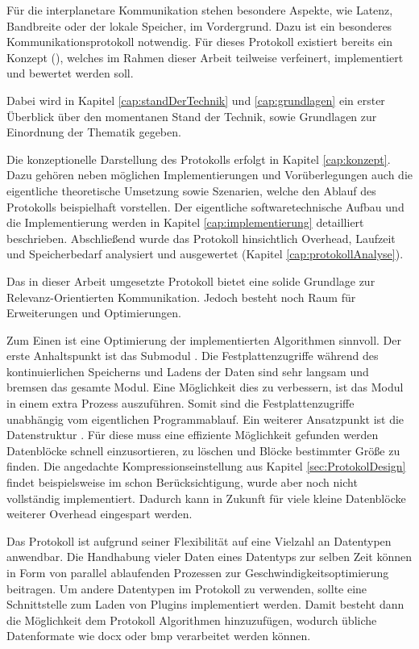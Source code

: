 Für die interplanetare Kommunikation stehen besondere Aspekte, wie Latenz,
Bandbreite oder der lokale Speicher, im Vordergrund. Dazu ist ein besonderes
Kommunikationsprotokoll notwendig. Für dieses Protokoll existiert
bereits ein Konzept (\cite{Daher}), welches im Rahmen dieser Arbeit
teilweise verfeinert, implementiert und bewertet werden soll.

Dabei wird in Kapitel \ref{cap:standDerTechnik} und \ref{cap:grundlagen} ein
erster Überblick über den momentanen Stand der Technik, sowie Grundlagen zur
Einordnung der Thematik gegeben.

Die konzeptionelle Darstellung des Protokolls erfolgt in Kapitel
\ref{cap:konzept}. Dazu gehören neben möglichen Implementierungen und
Vorüberlegungen auch die eigentliche theoretische Umsetzung sowie Szenarien,
welche den Ablauf des Protokolls beispielhaft vorstellen. Der eigentliche
softwaretechnische Aufbau und die Implementierung werden in Kapitel
\ref{cap:implementierung} detailliert beschrieben. Abschließend wurde das
Protokoll hinsichtlich Overhead, Laufzeit und Speicherbedarf analysiert und
ausgewertet (Kapitel \ref{cap:protokollAnalyse}).

Das in dieser Arbeit umgesetzte Protokoll bietet eine solide
Grundlage zur Relevanz-Orientierten Kommunikation. Jedoch besteht noch Raum
für Erweiterungen und Optimierungen.

Zum Einen ist eine Optimierung der implementierten Algorithmen sinnvoll.
Der erste Anhaltspunkt ist das Submodul .
Die Festplattenzugriffe während des kontinuierlichen Speicherns und Ladens der Daten
sind sehr langsam und bremsen das gesamte Modul. Eine Möglichkeit dies zu
verbessern, ist das Modul in einem extra Prozess auszuf{\"u}hren. Somit sind
die Festplattenzugriffe unabhängig vom eigentlichen Programmablauf. Ein
weiterer Ansatzpunkt ist die Datenstruktur . Für diese muss
eine effiziente Möglichkeit gefunden werden Datenblöcke schnell
einzusortieren, zu löschen und Bl{\"o}cke bestimmter Größe zu finden.
Die angedachte Kompressionseinstellung aus Kapitel \ref{sec:ProtokolDesign}
findet beispielsweise im  schon Berücksichtigung, wurde aber
noch nicht vollständig implementiert. Dadurch kann in Zukunft für viele kleine
Datenblöcke weiterer Overhead eingespart werden.

Das Protokoll ist aufgrund seiner Flexibilität auf eine Vielzahl an Datentypen
anwendbar. Die Handhabung vieler Daten eines Datentyps zur selben Zeit können
in Form von parallel ablaufenden Prozessen zur Geschwindigkeitsoptimierung
beitragen. Um andere Datentypen im Protokoll zu verwenden, sollte eine
Schnittstelle zum Laden von Plugins implementiert werden. Damit besteht dann die
Möglichkeit dem Protokoll Algorithmen hinzuzufügen, wodurch
übliche Datenformate wie docx oder bmp verarbeitet werden können.

